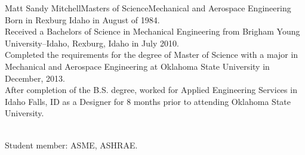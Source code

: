 \newpage
 \begin{vita}{Matt Sandy Mitchell}{Masters of Science}{Mechanical and Aerospace Engineering} %
  Born in Rexburg Idaho in August of 1984.             
  \\ Received a Bachelors of Science in Mechanical Engineering from Brigham Young University--Idaho, Rexburg, Idaho in July 2010. \\
Completed the requirements for the degree of Master of Science with a major in Mechanical and Aerospace Engineering at Oklahoma State University in December, 2013.
 \\ After completion of the B.S. degree, worked for Applied Engineering Services in Idaho Falls, ID as a Designer for 8 months prior to attending Oklahoma State University.
  \end{vita}
 \\ Student member: ASME, ASHRAE. 